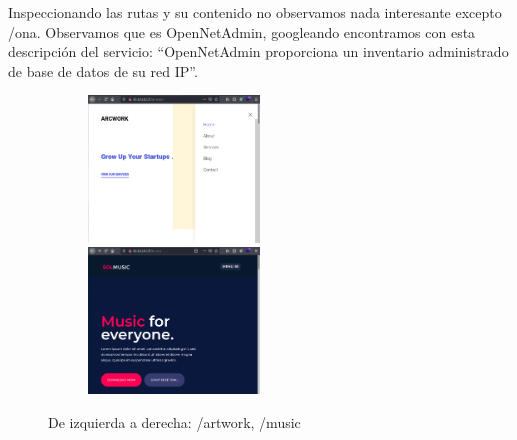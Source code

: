 \documentclass{article}
\begin{document}
Inspeccionando las rutas y su contenido no observamos nada interesante excepto /ona. Observamos que es OpenNetAdmin, googleando encontramos con esta descripción del servicio: “OpenNetAdmin proporciona un inventario administrado de base de datos de su red IP”.
\begin{figure}[H]
	\center
		\begin{subfigure}[c]{\linewidth}
		\includegraphics[width=0.5\textwidth]{images/openadmin/3-artwork.png}
		\includegraphics[width=0.5\textwidth]{images/openadmin/4-music.png}
		\end{subfigure}\par\medskip
	\caption{De izquierda a derecha: /artwork, /music}
\end{figure}
\end{document}
